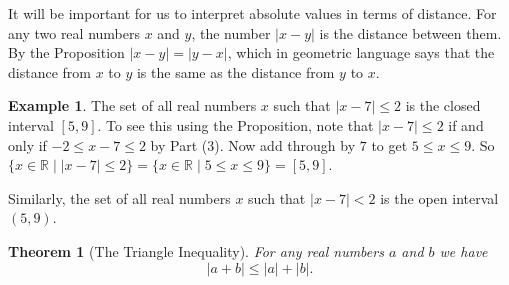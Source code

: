 \documentclass[12pt]{amsart}
\newcommand{\R}{{\mathbb{R}}}
\numberwithin{equation}{section}
\theoremstyle{plain} %
\newtheorem{thm}[equation]{Theorem}
\theoremstyle{definition}
\newtheorem{ex}[equation]{Example}
\theoremstyle{remark}
\newtheorem{rem}[equation]{Remark}
\def\and{{ \text{ and } }}
\begin{document}


It will be important for us to interpret absolute values in terms of distance. For any two real numbers $x$ and $y$, the number $|x-y|$ is the distance between them.
By the Proposition $|x-y| = |y - x|$, which in
geometric language says that the distance from $x$ to $y$ is the same as the distance from $y$ to $x$.



\begin{ex} The set of all real numbers $x$ such that $|x - 7| \leq 2$ is the closed interval $[5,9]$. To see this using the Proposition, note that
$|x-7| \leq 2$ if and only if $-2 \leq x-7 \leq 2$ by Part (3). Now add through by $7$ to get $5 \leq x \leq 9$. 
So $\{x \in \R \mid |x - 7| \leq 2\} = \{x \in \R \mid 5 \leq x \leq 9\} = [5,9]$. 

Similarly, the set of all real numbers $x$ such that $|x - 7| < 2$ is
the open interval $(5,9)$. 
\end{ex}


\begin{thm}[The Triangle Inequality] For any real numbers $a$ and $b$ we have
$$
|a + b| \leq |a| + |b|.
$$
\end{thm}




\end{document}
